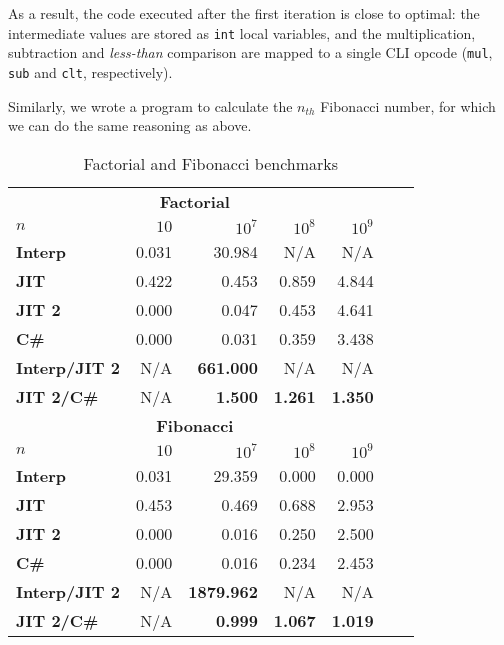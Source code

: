 As a result, the code executed after the first iteration is close to optimal:
the intermediate values are stored as \lstinline{int} local variables, and the
multiplication, subtraction and \emph{less-than} comparison are mapped to a
single CLI opcode (\lstinline{mul}, \lstinline{sub} and \lstinline{clt},
respectively).

Similarly, we wrote a program to calculate the $n_{th}$ Fibonacci number, for
which we can do the same reasoning as above.

\begin{table}[ht]
  \begin{center}

  \begin{tabular}{l|rrrrrr}
    \multicolumn{5}{c}{\textbf{Factorial}} \\ [0.5ex]

    \textbf{$n$}          & $10$  & $10^7$           & $10^8$         & $10^9$         \\
    \hline
    \textbf{Interp}       & 0.031 & 30.984           & N/A            & N/A            \\
    \textbf{JIT}          & 0.422 &  0.453           & 0.859          & 4.844          \\
    \textbf{JIT 2}        & 0.000 &  0.047           & 0.453          & 4.641          \\
    \textbf{C\#}          & 0.000 &  0.031           & 0.359          & 3.438          \\
    \textbf{Interp/JIT 2} & N/A   & \textbf{661.000} & N/A            & N/A            \\
    \textbf{JIT 2/C\#}    & N/A   & \textbf{1.500}   & \textbf{1.261} & \textbf{1.350} \\ [3ex]


    \multicolumn{5}{c}{\textbf{Fibonacci}} \\ [0.5ex]

    \textbf{$n$}          & $10$  & $10^7$           & $10^8$         & $10^9$         \\
    \hline
    \textbf{Interp}       & 0.031 & 29.359           & 0.000          & 0.000          \\
    \textbf{JIT}          & 0.453 &  0.469           & 0.688          & 2.953          \\
    \textbf{JIT 2}        & 0.000 &  0.016           & 0.250          & 2.500          \\ 
    \textbf{C\#}          & 0.000 &  0.016           & 0.234          & 2.453          \\
    \textbf{Interp/JIT 2} & N/A   & \textbf{1879.962}& N/A            & N/A            \\
    \textbf{JIT 2/C\#}    & N/A   & \textbf{0.999}   & \textbf{1.067} & \textbf{1.019} \\
  \end{tabular}

  \end{center}
  \caption{Factorial and Fibonacci benchmarks}
  \label{tab:factorial-fibo}
\end{table}


